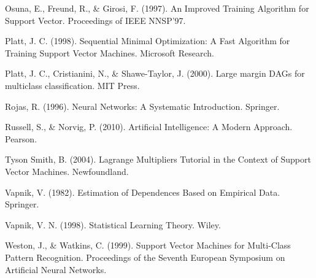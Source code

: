 Osuna, E., Freund, R., & Girosi, F. (1997). An Improved Training Algorithm for Support Vector. Proceedings of IEEE NNSP'97.

Platt, J. C. (1998). Sequential Minimal Optimization: A Fast Algorithm for Training Support Vector Machines. Microsoft Research.

Platt, J. C., Cristianini, N., & Shawe-Taylor, J. (2000). Large margin DAGs for multiclass classification. MIT Press.

Rojas, R. (1996). Neural Networks: A Systematic Introduction. Springer.

Russell, S., & Norvig, P. (2010). Artificial Intelligence: A Modern Approach. Pearson.

Tyson Smith, B. (2004). Lagrange Multipliers Tutorial in the Context of Support Vector Machines. Newfoundland.

Vapnik, V. (1982). Estimation of Dependences Based on Empirical Data. Springer.

Vapnik, V. N. (1998). Statistical Learning Theory. Wiley.

Weston, J., & Watkins, C. (1999). Support Vector Machines for Multi-Class Pattern Recognition. Proceedings of the Seventh European Symposium on Artificial Neural Networks.